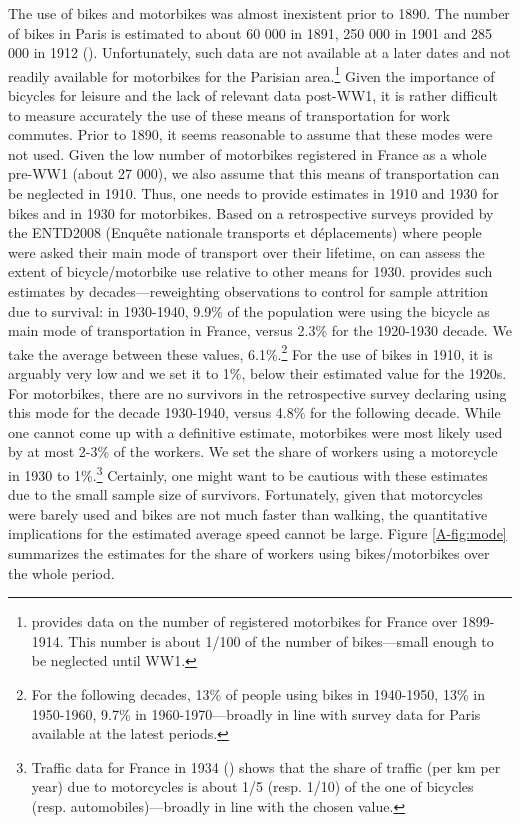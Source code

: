 \documentclass[11pt]{report}
\begin{document}
The use of bikes and motorbikes was almost inexistent prior to 1890. The number of bikes in Paris is estimated to about 60 000 in 1891, 250 000 in 1901 and 285 000 in 1912 (\cite{orselli2008usages}). Unfortunately, such data are not available at a later dates and not readily available for motorbikes for the Parisian area.\footnote{\cite{orselli2008usages} provides data on the number of registered motorbikes for France over 1899-1914. This number is about 1/100 of the number of bikes---small enough to be neglected until WW1.} Given the importance of bicycles for leisure and the lack of relevant data post-WW1, it is rather difficult to measure accurately the use of these means of transportation for work commutes. Prior to 1890, it seems reasonable to assume that these modes were not used. Given the low number of motorbikes registered in France as a whole pre-WW1 (about 27 000), we also assume that this means of transportation can be neglected in 1910. Thus, one needs to provide estimates in 1910 and 1930 for bikes and in 1930 for motorbikes. Based on a retrospective surveys provided by the ENTD2008 (Enqu\^ete nationale transports et d\'eplacements) where people were asked their main mode of transport over their lifetime, on can assess the extent of bicycle/motorbike use relative to other means for 1930. \cite{papon2010parcours} provides such estimates by decades---reweighting observations to control for sample attrition due to survival: in 1930-1940, 9.9\% of the population were using the bicycle as main mode of transportation in France, versus 2.3\% for the 1920-1930 decade. We take the average between these values, 6.1\%.\footnote{For the following decades, 13\% of people using bikes in 1940-1950, 13\% in 1950-1960, 9.7\% in 1960-1970---broadly in line with survey data for Paris available at the latest periods.} For the use of bikes in 1910, it is arguably very low and we set it to 1\%, below their estimated value for the 1920s. For motorbikes, there are no survivors in the retrospective survey declaring using this mode for the decade 1930-1940, versus 4.8\% for the following decade. While one cannot come up with a definitive estimate, motorbikes were most likely used by at most 2-3\% of the workers. We set the share of workers using a motorcycle in 1930 to 1\%.\footnote{Traffic data for France in 1934 (\cite{orselli2008usages}) shows that the share of traffic (per km per year) due to motorcycles is about 1/5 (resp. 1/10) of the one of bicycles (resp. automobiles)---broadly in line with the chosen value.} Certainly, one might want to be cautious with these estimates due to the small sample size of survivors. Fortunately, given that motorcycles were barely used and bikes are not much faster than walking, the quantitative implications for the estimated average speed cannot be large. Figure \ref{A-fig:mode} summarizes the estimates for the share of workers using bikes/motorbikes over the whole period.
\end{document}
